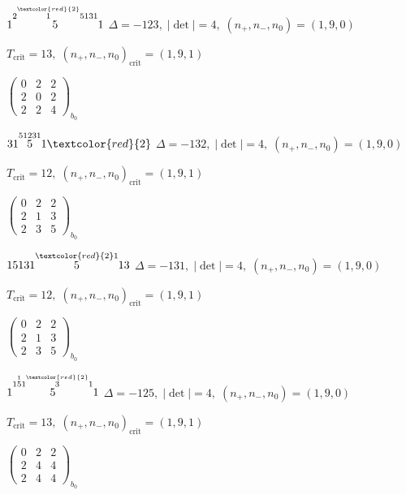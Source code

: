 \documentclass[10pt]{article}
\begin{document}
$1\overset{2\overset{\textcolor{red}{2}}{1}5131}{5}1$ \quad $\Delta=-123,\; |\det|=4,\; (n_+,n_-,n_0)=(1,9,0)$

\hspace{1em}$T_{\text{crit}}=13,\; (n_+,n_-,n_0)_{\text{crit}}=(1,9,1)$

\hspace{2em}$\left(\begin{smallmatrix}0 & 2 & 2 \\ 2 & 0 & 2 \\ 2 & 2 & 4\end{smallmatrix}\right)_{\!b_0}$

\smallskip

$31\overset{51231}{5}1\textcolor{red}{2}$ \quad $\Delta=-132,\; |\det|=4,\; (n_+,n_-,n_0)=(1,9,0)$

\hspace{1em}$T_{\text{crit}}=12,\; (n_+,n_-,n_0)_{\text{crit}}=(1,9,1)$

\hspace{2em}$\left(\begin{smallmatrix}0 & 2 & 2 \\ 2 & 1 & 3 \\ 2 & 3 & 5\end{smallmatrix}\right)_{\!b_0}$

\smallskip

$15131\overset{\textcolor{red}{2}1}{5}13$ \quad $\Delta=-131,\; |\det|=4,\; (n_+,n_-,n_0)=(1,9,0)$

\hspace{1em}$T_{\text{crit}}=12,\; (n_+,n_-,n_0)_{\text{crit}}=(1,9,1)$

\hspace{2em}$\left(\begin{smallmatrix}0 & 2 & 2 \\ 2 & 1 & 3 \\ 2 & 3 & 5\end{smallmatrix}\right)_{\!b_0}$

\smallskip

$1\overset{1\overset{1}{5}1\overset{\textcolor{red}{2}}{3}1}{5}1$ \quad $\Delta=-125,\; |\det|=4,\; (n_+,n_-,n_0)=(1,9,0)$

\hspace{1em}$T_{\text{crit}}=13,\; (n_+,n_-,n_0)_{\text{crit}}=(1,9,1)$

\hspace{2em}$\left(\begin{smallmatrix}0 & 2 & 2 \\ 2 & 4 & 4 \\ 2 & 4 & 4\end{smallmatrix}\right)_{\!b_0}$
\end{document}
